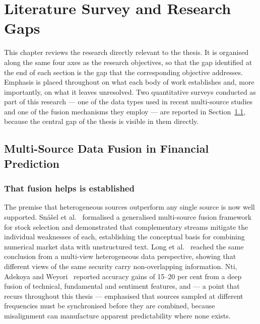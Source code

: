 \chapter{Literature Survey and Research Gaps}
\label{ch:litsurvey}

This chapter reviews the research directly relevant to the thesis. It is organised along the
same four axes as the research objectives, so that the gap identified at the end of each
section is the gap that the corresponding objective addresses. Emphasis is placed throughout on
what each body of work establishes and, more importantly, on what it leaves unresolved. Two
quantitative surveys conducted as part of this research --- one of the data types used in
recent multi-source studies and one of the fusion mechanisms they employ --- are reported in
Section~\ref{sec:fusionsurvey}, because the central gap of the thesis is visible in them
directly.

\section{Multi-Source Data Fusion in Financial Prediction}
\label{sec:fusionsurvey}

\subsection{That fusion helps is established}

The premise that heterogeneous sources outperform any single source is now well supported.
Snášel et al.~\cite{snasel2024} formalised a generalised multi-source fusion framework for stock
selection and demonstrated that complementary streams mitigate the individual weaknesses of each,
establishing the conceptual basis for combining numerical market data with unstructured text.
Long et al.~\cite{long2024} reached the same conclusion from a multi-view heterogeneous data
perspective, showing that different views of the same security carry non-overlapping
information. Nti, Adekoya and Weyori~\cite{nti2021} reported accuracy gains of 15--20 per cent
from a deep fusion of technical, fundamental and sentiment features, and --- a point that
recurs throughout this thesis --- emphasised that sources sampled at different frequencies must
be synchronised before they are combined, because misalignment can manufacture apparent
predictability where none exists.


